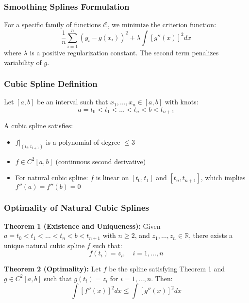 \documentclass[12pt,a4paper]{article}
\begin{document}
\subsubsection{Smoothing Splines Formulation}

For a specific family of functions $\mathcal{C}$, we minimize the criterion function:
\begin{equation}
\frac{1}{n}\sum_{i=1}^n (y_i - g(x_i))^2 + \lambda \int [g''(x)]^2 dx
\end{equation}
where $\lambda$ is a positive regularization constant. The second term penalizes variability of $g$.

\subsubsection{Cubic Spline Definition}

Let $[a,b]$ be an interval such that $x_1, \ldots, x_n \in [a,b]$ with knots:
\begin{equation}
a = t_0 < t_1 < \ldots < t_n < b < t_{n+1}
\end{equation}

A cubic spline satisfies:
\begin{itemize}
    \item $f|_{(t_i, t_{i+1})}$ is a polynomial of degree $\leq 3$
    \item $f \in C^2[a,b]$ (continuous second derivative)
    \item For natural cubic spline: $f$ is linear on $[t_0, t_1]$ and $[t_n, t_{n+1}]$, which implies $f''(a) = f''(b) = 0$
\end{itemize}

\subsubsection{Optimality of Natural Cubic Splines}

\textbf{Theorem 1 (Existence and Uniqueness):} Given $a = t_0 < t_1 < \ldots < t_n < b < t_{n+1}$ with $n \geq 2$, and $z_1, \ldots, z_n \in \mathbb{R}$, there exists a unique natural cubic spline $f$ such that:
\begin{equation}
f(t_i) = z_i, \quad i = 1, \ldots, n
\end{equation}

\textbf{Theorem 2 (Optimality):} Let $f$ be the spline satisfying Theorem 1 and $g \in C^2[a,b]$ such that $g(t_i) = z_i$ for $i = 1, \ldots, n$. Then:
\begin{equation}
\int [f''(x)]^2 dx \leq \int [g''(x)]^2 dx
\end{equation}
\end{document}
